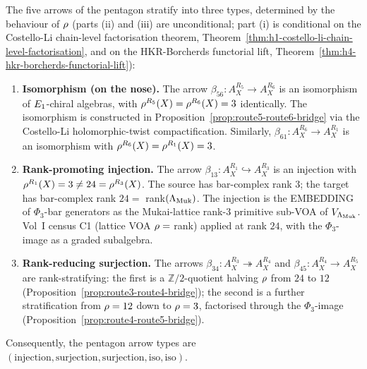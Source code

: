 \begin{proposition}
\label{prop:cy-c-pentagon-arrow-types}
The five arrows of the pentagon stratify into three types, determined by the behaviour of $\rho$
(parts (ii) and (iii) are unconditional; part (i) is conditional on the Costello-Li chain-level
factorisation theorem, Theorem~\ref{thm:h1-costello-li-chain-level-factorisation}, and on the HKR-Borcherds
functorial lift, Theorem~\ref{thm:h4-hkr-borcherds-functorial-lift}):
\begin{enumerate}[label=\textup{(\roman*)}]
 \item \textbf{Isomorphism (on the nose).} The arrow $\beta_{56}: A_X^{R_5} \to A_X^{R_6}$ is an isomorphism
 of $E_{1}$-chiral algebras, with $\rho^{R_5}(X) = \rho^{R_6}(X) = 3$ identically. The isomorphism is
 constructed in Proposition~\ref{prop:route5-route6-bridge} via the Costello-Li holomorphic-twist
 compactification. Similarly, $\beta_{61}: A_X^{R_6} \to A_X^{R_1}$ is an isomorphism with
 $\rho^{R_6}(X) = \rho^{R_1}(X) = 3$.
 \item \textbf{Rank-promoting injection.} The arrow $\beta_{13}: A_X^{R_1} \hookrightarrow A_X^{R_3}$ is an
 injection with $\rho^{R_1}(X) = 3 \ne 24 = \rho^{R_3}(X)$. The source has bar-complex rank $3$; the
 target has bar-complex rank $24 = $ rank$(\Lambda_{\mathrm{Muk}})$. The injection is the EMBEDDING of $\Phi_3$-bar
 generators as the Mukai-lattice rank-$3$ primitive sub-VOA of $V_{\Lambda_{\mathrm{Muk}}}$. Vol~I census C1 (lattice
 VOA $\rho = $ rank) applied at rank $24$, with the $\Phi_3$-image as a graded subalgebra.
 \item \textbf{Rank-reducing surjection.} The arrows $\beta_{34}: A_X^{R_3} \twoheadrightarrow A_X^{R_4}$
 and $\beta_{45}: A_X^{R_4} \to A_X^{R_5}$ are rank-stratifying: the first is a $\mathbb{Z}/2$-quotient
 halving $\rho$ from $24$ to $12$ (Proposition~\ref{prop:route3-route4-bridge}); the second is a
 further stratification from $\rho = 12$ down to $\rho = 3$, factorised through the $\Phi_3$-image
 (Proposition~\ref{prop:route4-route5-bridge}).
\end{enumerate}
Consequently, the pentagon arrow types are $(\text{injection}, \text{surjection}, \text{surjection}, \text{iso}, \text{iso})$.
\end{proposition}

